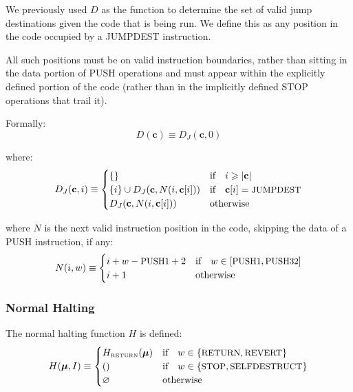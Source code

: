 \documentclass[9pt,oneside]{amsart}
\begin{document}
\begin{multicols}{2}
We previously used $D$ as the function to determine the set of valid jump destinations given the code that is being run. We define this as any position in the code occupied by a {\small JUMPDEST} instruction.

All such positions must be on valid instruction boundaries, rather than sitting in the data portion of {\small PUSH} operations and must appear within the explicitly defined portion of the code (rather than in the implicitly defined {\small STOP} operations that trail it).

Formally:
\begin{equation}
D(\mathbf{c}) \equiv D_{J}(\mathbf{c}, 0)
\end{equation}

where:
\begin{equation}
D_{J}(\mathbf{c}, i) \equiv \begin{cases}
\{\} & \text{if} \quad i \geqslant |\mathbf{c}|  \\
\{ i \} \cup D_{J}(\mathbf{c}, N(i, \mathbf{c}[i])) & \text{if} \quad \mathbf{c}[i] = \text{\small JUMPDEST} \\
D_{J}(\mathbf{c}, N(i, \mathbf{c}[i])) & \text{otherwise} \\
\end{cases}
\end{equation}

where $N$ is the next valid instruction position in the code, skipping the data of a {\small PUSH} instruction, if any:
\begin{equation}
N(i, w) \equiv \begin{cases}
i + w - \text{\small PUSH1} + 2 & \text{if} \quad w \in [\text{\small PUSH1}, \text{\small PUSH32}] \\
i + 1 & \text{otherwise} \end{cases}
\end{equation}

\subsubsection{Normal Halting}\hypertarget{normal_halting_function_H}{}

The normal halting function $H$ is defined:
\begin{equation}
H(\boldsymbol{\mu}, I) \equiv \begin{cases}
H_{\text{\tiny RETURN}}(\boldsymbol{\mu}) & \text{if} \quad w \in \{\text{\small RETURN}, \text{\small REVERT}\} \\
() & \text{if} \quad w \in \{ \text{\small STOP}, \text{\small SELFDESTRUCT} \} \\
\varnothing & \text{otherwise}
\end{cases}
\end{equation}


\end{multicols}
\end{document}
